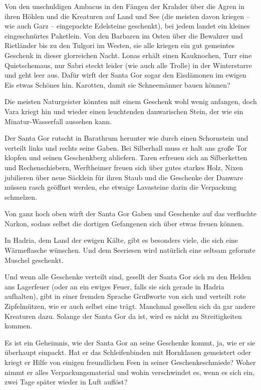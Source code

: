 \documentclass[10pt, a4paper, oneside]{book}
\begin{document}
Von den unschuldigen Ambacus in den Fängen der Krahder über die Agren in ihren Höhlen und die Kreaturen auf Land und See (die meisten davon kriegen – wie auch Garz – eingepackte Edelsteine geschenkt), bei jedem landet ein kleines eingeschnürtes Paketlein. Von den Barbaren im Osten über die Bewahrer und Rietländer bis zu den Tulgori im Westen, sie alle kriegen ein gut gemeintes Geschenk in dieser glorreichen Nacht. Lonas erhält einen Kauknochen, Turr eine Quietschemaus, nur Sabri steckt leider (wie auch alle Trolle) in der Winterstarre und geht leer aus. Dafür wirft der Santa Gor sogar den Eisdämonen im ewigen Eis etwas Schönes hin. Karotten, damit sie Schneemänner bauen können?

Die meisten Naturgeister könnten mit einem Geschenk wohl wenig anfangen, doch Vara kriegt hin und wieder einen leuchtenden danwarischen Stein, der wie ein Minatur-Wasserfall aussehen kann.

Der Santa Gor rutscht in Barathrum herunter wie durch einen Schornstein und verteilt links und rechts seine Gaben. Bei Silberhall muss er halt ans große Tor klopfen und seinen Geschenkberg abliefern. Taren erfreuen sich an Silberketten und Rechenschiebern, Werftheimer freuen sich über gutes starkes Holz, Nixen jubilieren über neue Säcklein für ihren Staub und die Geschenke der Danware müssen rasch geöffnet werden, ehe etwaige Lavasteine darin die Verpackung schmelzen.

Von ganz hoch oben wirft der Santa Gor Gaben und Geschenke auf das verfluchte Narkon, sodass selbst die dortigen Gefangenen sich über etwas freuen können.

In Hadria, dem Land der ewigen Kälte, gibt es besonders viele, die sich eine Wärmeflasche wünschen. Und dem Seeriesen wird natürlich eine seltsam geformte Muschel geschenkt.

Und wenn alle Geschenke verteilt sind, gesellt der Santa Gor sich zu den Helden ans Lagerfeuer (oder an ein ewiges Feuer, falls sie sich gerade in Hadria aufhalten), gibt in einer fremden Sprache Grußworte von sich und verteilt rote Zipfelmützen, wie er auch selbst eine trägt. Manchmal gesellen sich da gar andere Kreaturen dazu. Solange der Santa Gor da ist, wird es nicht zu Streitigkeiten kommen.

Es ist ein Geheimnis, wie der Santa Gor an seine Geschenke kommt, ja, wie er sie überhaupt einpackt. Hat er das Schleifenbinden mit Hornklauen gemeistert oder kriegt er Hilfe von einigen freundlichen Feen in seiner Geschenkeschmiede? Woher nimmt er alles Verpackungsmaterial und wohin verschwindet es, wenn es sich ein, zwei Tage später wieder in Luft auflöst?
\end{document}
